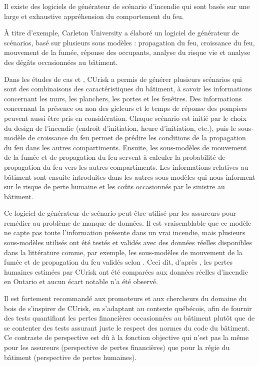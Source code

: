 \documentclass[11pt]{article}
\begin{document}
Il existe des logiciels de générateur de scénario d’incendie qui sont basés sur une large et exhaustive appréhension du comportement du feu. 

À titre d'exemple, Carleton University a élaboré un logiciel de générateur de scénarios, basé sur plusieurs sous modèles : propagation du feu, croissance du feu, mouvement de la fumée, réponse des occupants, analyse du risque vie et analyse des dégâts occasionnées au bâtiment. 

Dans les études de cas \cite{zhang2015case} et \cite{hadji}, CUrisk a permis de générer plusieurs scénarios qui sont des combinaisons des caractéristiques du bâtiment, à savoir les informations concernant les murs, les planchers, les portes et les fenêtres. Des informations concernant la présence ou non des gicleurs et le temps de réponse des pompiers peuvent aussi être pris en considération. Chaque scénario est initié par le choix du design de l'incendie (endroit d'initiation, heure d'initiation, etc.), puis le sous-modèle de croissance du feu permet de prédire les conditions de la propagation du feu dans les autres compartiments. Ensuite, les sous-modèles de mouvement de la fumée et de propagation du feu servent à calculer la probabilité de propagation du feu vers les autres compartiments. Les informations relatives au bâtiment sont ensuite introduites dans les autres sous-modèles qui nous informent sur le risque de perte humaine et les coûts occasionnés par le sinistre au bâtiment.

Ce logiciel de générateur de scénario peut être utilisé par les assureurs pour remédier au problème de manque de données. Il est vraisemblable que ce modèle ne capte pas toute l'information présente dans un vrai incendie, mais plusieurs sous-modèles utilisés ont été testés et validés avec des données réelles disponibles dans la littérature comme, par exemple, les sous-modèles de mouvement de la fumée et de propagation du feu validés selon \cite{zhang2012improved}. Ceci dit, d'après \cite{xin2013fire}, les pertes humaines estimées par CUrisk ont été comparées aux données réelles d'incendie en Ontario et aucun écart notable n'a été observé. 

Il est fortement recommandé aux promoteurs et aux chercheurs du domaine du bois de s'inspirer de CUrisk, en s'adaptant au contexte québécois, afin de fournir des tests quantifiant les pertes financières occasionnées au bâtiment plutôt que de se contenter des tests assurant juste le respect des normes du code du bâtiment. Ce contraste de perspective est dû à la fonction objective qui n'est pas la même pour les assureurs (perspective de pertes financières) que pour la régie du bâtiment (perspective de pertes humaines).
\end{document}
